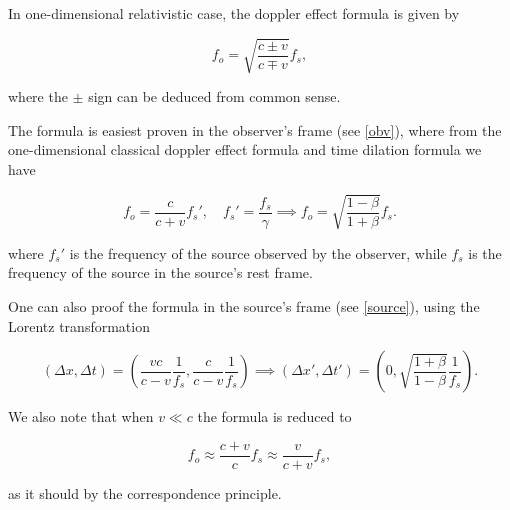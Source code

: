 \documentclass[english,a4paper,12pt]{report}
\begin{document}
In one-dimensional relativistic case, the doppler effect formula is given by 

\begin{equation}
    f_{o} = \sqrt{\frac{c\pm v}{c \mp v} } f_{s} ,  
\end{equation}

where the \(\pm \) sign can be deduced from common sense.

The formula is easiest proven in the observer's frame (see \cref{obv}), where from the one-dimensional classical doppler effect formula and time dilation formula we have 

\begin{equation}
    f_{o} = \frac{c}{c+v} f_{s}', \quad f_{s}' = \frac{f_{s} }{\gamma } \implies f_{o} = \sqrt{\frac{1-\beta }{1+\beta } } f_{s}.   
\end{equation}

where \(f_{s} '\) is the frequency of the source observed by the observer, while \(f_{s} \) is the frequency of the source in the source's rest frame. 

One can also proof the formula in the source's frame (see \cref{source}), using the Lorentz transformation 

\begin{equation}
    (\Delta x,\Delta t) = \left( \frac{vc}{c-v} \frac{1}{f_{s} }, \frac{c}{c-v} \frac{1}{f_{s} }     \right) \implies (\Delta x', \Delta t') = \left( 0, \sqrt{\frac{1+\beta }{1-\beta } } \frac{1}{f_{s} }  \right).
\end{equation}




We also note that when \(v \ll c\) the formula is reduced to 

\begin{equation}
    f_{o} \approx \frac{c+v}{c} f_{s} \approx \frac{v}{c+v} f_{s},     
\end{equation}

as it should by the correspondence principle.  
\end{document}
